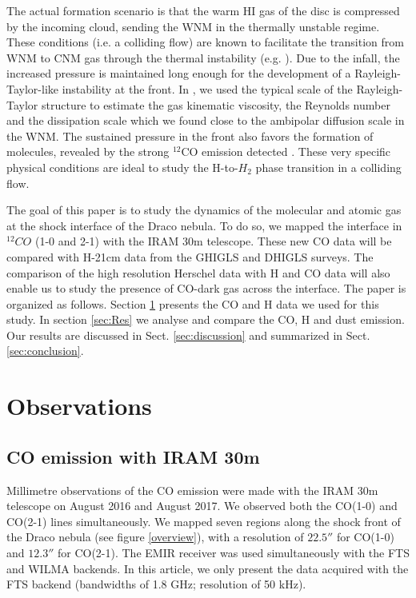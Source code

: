 \documentclass[traditabstract]{aa}
\begin{document}
   The actual formation scenario is that the warm HI gas of the disc is compressed by the incoming cloud, sending the WNM in the thermally unstable regime. These conditions (i.e. a colliding flow) are known to facilitate the transition from WNM to CNM gas through the thermal instability (e.g. \citealt{Saury_2014}). Due to the infall, the increased pressure is maintained long enough for the development of a Rayleigh-Taylor-like instability at the front. In \cite{MAMD_2017b}, we used the typical scale of the Rayleigh-Taylor structure to estimate the gas kinematic viscosity, the Reynolds number and the dissipation scale which we found close to the ambipolar diffusion scale in the WNM.
The sustained pressure in the front also favors the formation of molecules, revealed by the strong $^{12}$CO emission detected \citep{Mebold_1985}. These very specific physical conditions are ideal to study the H-to-$H_2$ phase transition in a colliding flow.

   The goal of this paper is to study the dynamics of the molecular and atomic gas at the shock interface of the Draco nebula. To do so, we mapped the interface in $^{12}CO$ (1-0 and 2-1) with the IRAM 30m telescope. These new CO data will be compared with H-21cm data from the GHIGLS \citep{Martin_2015} and DHIGLS \citep{Blagrave_2017} surveys.
The comparison of the high resolution Herschel data with H and CO data will also enable us to study the presence of CO-dark gas across the interface.
The paper is organized as follows. Section \ref{sec:Obs} presents the CO and H data we used for this study. In section \ref{sec:Res} we analyse and compare the CO, H and dust emission. Our results are discussed in Sect. \ref{sec:discussion} and summarized in Sect. \ref{sec:conclusion}.%




\section{Observations}
\label{sec:Obs}

   \subsection{CO emission with IRAM 30m}

   Millimetre observations of the CO emission were made with the IRAM 30m telescope on August 2016 and August 2017. We observed both the CO(1-0) and CO(2-1) lines simultaneously. We mapped seven regions along the shock front of the Draco nebula (see figure \ref{overview}), with a resolution of $22.5''$ for CO(1-0) and $12.3''$ for CO(2-1). The EMIR receiver was used simultaneously with the FTS and WILMA backends. In this article, we only present the data acquired with the FTS backend (bandwidths of 1.8 GHz; resolution of 50 kHz).
\end{document}
